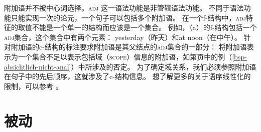 附加语并不被中心词选择。\textsc{adj}
这一语法功能是非管辖语法功能。
不同于语法功能只能实现一次的论元，一个句子可以包括多个附加语。
在一个f-结构中，\textsc{adj}特征的取值不能是一个单一的结构而应该是一个集合。
例如，（a）的f-结构包括一个\textsc{adj}集合，这个集合中有两个元素：
yesterday（昨天）和at noon（在中午）。
\eal
{}
\ex\label{fstruc-david-devoured-a-sandwich-at-noon-yesterday} 
\zl
%
针对附加语的c-结构的标注要求附加语是其父结点的\textsc{adj}集合的一部分：
\ea
{}
\z
将附加语表示为一个集合不足以表示包括域（\textsc{scope}）信息的附加语，如第\pageref{bsp-absichtlich-nicht-anal}页中的例（\ref{bsp-absichtlich-nicht-anal}）中所涉及的否定。
为了确定域关系，我们必须参照附加语在句子中的先后顺序，这就涉及了c-结构信息。
想了解更多的关于语序线性化的限制，可以参考 。

\section{被动}
\label{Abschnitt-LFG-Passiv}



